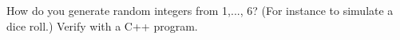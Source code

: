 How do you generate random integers from 1,..., 6? (For instance to simulate a dice roll.) Verify with a C++ program.

